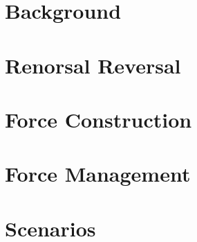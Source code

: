\documentclass{article}
\begin{document}
\newpage

\section{Background}



\newpage

\section{Renorsal Reversal}



\newpage

\section{Force Construction}



\newpage

\section{Force Management}



\newpage

\section{Scenarios}



\newpage
\end{document}

